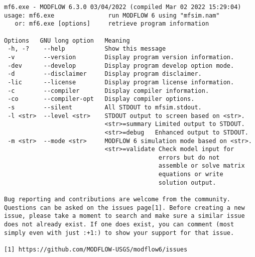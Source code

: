 {\small
\begin{lstlisting}[style=modeloutput]
mf6.exe - MODFLOW 6.3.0 03/04/2022 (compiled Mar 02 2022 15:29:04)
usage: mf6.exe               run MODFLOW 6 using "mfsim.nam"
   or: mf6.exe [options]     retrieve program information

Options   GNU long option   Meaning
 -h, -?    --help           Show this message
 -v        --version        Display program version information.
 -dev      --develop        Display program develop option mode.
 -d        --disclaimer     Display program disclaimer.
 -lic      --license        Display program license information.
 -c        --compiler       Display compiler information.
 -co       --compiler-opt   Display compiler options.
 -s        --silent         All STDOUT to mfsim.stdout.
 -l <str>  --level <str>    STDOUT output to screen based on <str>.
                            <str>=summary Limited output to STDOUT.
                            <str>=debug   Enhanced output to STDOUT.
 -m <str>  --mode <str>     MODFLOW 6 simulation mode based on <str>.
                            <str>=validate Check model input for
                                           errors but do not
                                           assemble or solve matrix
                                           equations or write
                                           solution output.

Bug reporting and contributions are welcome from the community.
Questions can be asked on the issues page[1]. Before creating a new
issue, please take a moment to search and make sure a similar issue
does not already exist. If one does exist, you can comment (most
simply even with just :+1:) to show your support for that issue.

[1] https://github.com/MODFLOW-USGS/modflow6/issues


\end{lstlisting}
}
